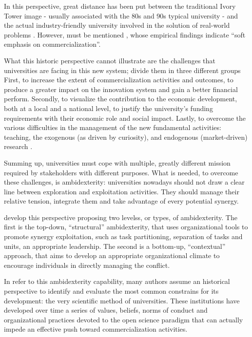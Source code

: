 In this perspective, great distance has been put between the traditional Ivory Tower image - usually associated with the 80s and 90s typical university - and the actual industry-friendly university involved in the solution of real-world problems \citep{Baldini2006}. However, must be mentioned \citet{Rasmussen2006}, whose empirical findings indicate \enquote{soft emphasis on commercialization}.

What this historic perspective cannot illustrate are the challenges that universities are facing in this new system; \citet{Rasmussen2006} divide them in three different groups First, to increase the extent of commercialization activities and outcomes, to produce a greater impact on the innovation system and gain a better financial perform. Secondly, to visualize the contribution to the economic development, both at a local and a national level, to justify the university's funding requirements with their economic role and social impact. Lastly, to overcome the various difficulties in the management of the new fundamental activities: teaching, the exogenous (as driven by curiosity), and endogenous (market-driven) research \citep{Debackere2005}. 

Summing up, universities must cope with multiple, greatly different mission required by stakeholders with different purposes. What is needed, to overcome these challenges, is ambidexterity: universities nowadays should not draw a clear line between exploration and exploitation activities. They should manage their relative tension, integrate them and take advantage of every potential synergy.

\citet{Chang2016} develop this perspective proposing two levelss, or types, of ambidexterity. The first is the top-down, \enquote{structural} ambidexterity, that uses organizational tools to promote synergy exploitation, such as task partitioning, separation of tasks and units, an appropriate leadership. The second is a bottom-up, \enquote{contextual} approach, that aims to develop an appropriate organizational climate to encourage individuals in directly managing the conflict.

In refer to this ambidexterity capability, many authors assume an historical perspective to identify and evaluate the most common constrains for its development: the very scientific method of universities. These institutions have developed over time a series of values, beliefs, norms of conduct and organizational practices devoted to the open science paradigm that can actually impede an effective push toward commercialization activities. 

